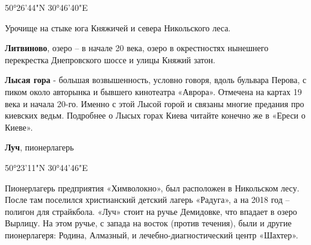 50°26'44"N 30°46'40"E

Урочище на стыке юга Княжичей и севера Никольского леса.\\

\medskip


\textbf{Литвиново}, озеро – в начале 20 века, озеро в окрестностях нынешнего перекрестка Днепровского шоссе и улицы Княжий затон.\\

\medskip


\textbf{Лысая гора} - большая возвышенность, условно говоря, вдоль бульвара Перова, с пиком около авторынка и бывшего кинотеатра «Аврора». Отмечена на картах 19 века и начала 20-го. Именно с этой Лысой горой и связаны многие предания про киевских ведьм. Подробнее о Лысых горах Киева читайте конечно же в «Ереси о Киеве».\\

\medskip


\textbf{Луч}, пионерлагерь

50°23'11"N 30°44'46"E

Пионерлагерь предприятия «Химволокно», был расположен в Никольском лесу. После там поселился христианский детский лагерь «Радуга», а на 2018 год – полигон для страйкбола. «Луч» стоит на ручье Демидовке, что впадает в озеро Вырлицу. На этом ручье, с запада на восток (против течения), были и другие пионерлагеря: Родина, Алмазный, и лечебно-диагностический центр «Шахтер».

